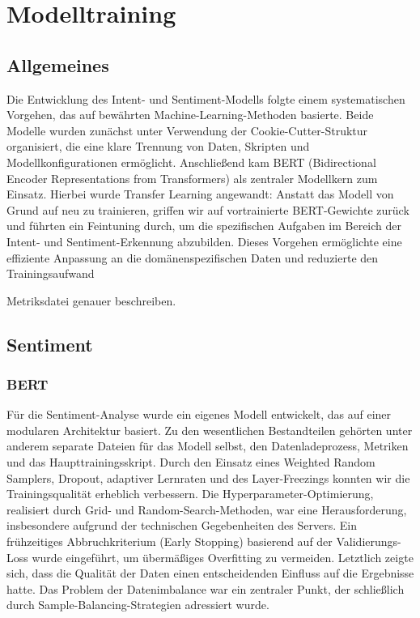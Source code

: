 \section{Modelltraining}

\subsection{Allgemeines}

Die Entwicklung des Intent- und Sentiment-Modells folgte einem systematischen Vorgehen,
das auf bewährten Machine-Learning-Methoden basierte. Beide Modelle wurden zunächst unter
Verwendung der Cookie-Cutter-Struktur organisiert, die eine klare Trennung von Daten, Skripten
und Modellkonfigurationen ermöglicht. Anschließend kam BERT (Bidirectional Encoder
Representations from Transformers) als zentraler Modellkern zum Einsatz. Hierbei wurde Transfer
Learning angewandt: Anstatt das Modell von Grund auf neu zu trainieren, griffen wir auf
vortrainierte BERT-Gewichte zurück und führten ein Feintuning durch, um die spezifischen
Aufgaben im Bereich der Intent- und Sentiment-Erkennung abzubilden. Dieses Vorgehen ermöglichte
eine effiziente Anpassung an die domänenspezifischen Daten und reduzierte den Trainingsaufwand 
 
Metriksdatei genauer beschreiben. 

\subsection{Sentiment}
\subsubsection{BERT}

Für die Sentiment-Analyse wurde ein eigenes Modell entwickelt, das auf einer modularen
Architektur basiert. Zu den wesentlichen Bestandteilen gehörten unter anderem separate
Dateien für das Modell selbst, den Datenladeprozess, Metriken und das Haupttrainingsskript.
Durch den Einsatz eines Weighted Random Samplers, Dropout, adaptiver Lernraten und des
Layer-Freezings konnten wir die Trainingsqualität erheblich verbessern. Die
Hyperparameter-Optimierung, realisiert durch Grid- und Random-Search-Methoden, war eine
Herausforderung, insbesondere aufgrund der technischen Gegebenheiten des Servers. Ein
frühzeitiges Abbruchkriterium (Early Stopping) basierend auf der Validierungs-Loss wurde
eingeführt, um übermäßiges Overfitting zu vermeiden. Letztlich zeigte sich, dass die Qualität
der Daten einen entscheidenden Einfluss auf die Ergebnisse hatte. Das Problem der Datenimbalance
war ein zentraler Punkt, der schließlich durch Sample-Balancing-Strategien adressiert wurde. 



